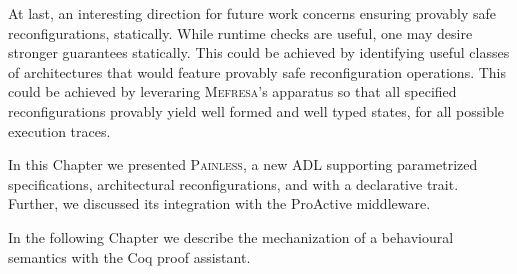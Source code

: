 	At last, an interesting direction for future work concerns ensuring provably safe
	reconfigurations, statically. While runtime checks are useful, one may
	desire stronger guarantees statically. This could be achieved by
	identifying useful classes of architectures that would feature
	provably safe reconfiguration operations. This could be achieved
	by leveraring \textsc{Mefresa}'s apparatus so that all specified reconfigurations provably
	yield \textsf{well formed} and \textsf{well typed} states, for all 
	possible execution traces.





\chapbreak

	In this Chapter we presented \textsc{Painless}, a new \ac{ADL} supporting parametrized specifications,
	architectural reconfigurations, and with a declarative trait. Further, we discussed its integration with
	the ProActive middleware.
		
		In the following Chapter we describe the mechanization of a behavioural semantics with the
		Coq proof assistant.
	
	
	
	
	
